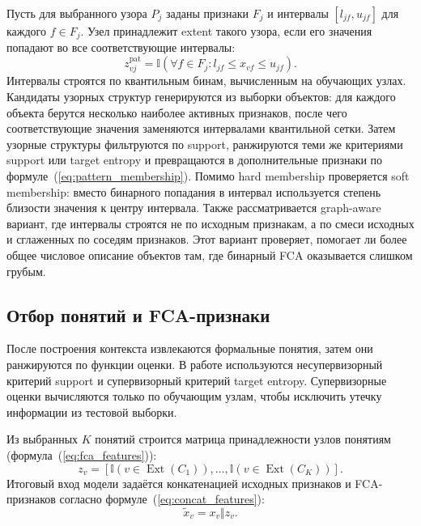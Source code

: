 \documentclass[14pt,a4paper]{extarticle}
\begin{document}
Пусть для выбранного узора $P_j$ заданы признаки $F_j$ и интервалы
$[l_{jf}, u_{jf}]$ для каждого $f \in F_j$. Узел принадлежит extent такого узора,
если его значения попадают во все соответствующие интервалы:
\begin{equation}
    z_{vj}^{\mathrm{pat}} =
    \mathbb{I}
    \left(
        \forall f \in F_j:
        l_{jf} \leq x_{vf} \leq u_{jf}
    \right).
    \label{eq:pattern_membership}
\end{equation}
Интервалы строятся по квантильным бинам, вычисленным на обучающих узлах. Кандидаты
узорных структур генерируются из выборки объектов: для каждого объекта берутся
несколько наиболее активных признаков, после чего соответствующие значения
заменяются интервалами квантильной сетки. Затем узорные структуры фильтруются по
support, ранжируются теми же критериями support или target entropy и превращаются
в дополнительные признаки по формуле~(\ref{eq:pattern_membership}). Помимо hard
membership проверяется soft membership: вместо бинарного попадания в интервал
используется степень близости значения к центру интервала. Также рассматривается
graph-aware вариант, где интервалы строятся не по исходным признакам, а по смеси
исходных и сглаженных по соседям признаков. Этот вариант проверяет, помогает ли
более общее числовое описание объектов там, где бинарный FCA оказывается слишком
грубым.

\subsection{Отбор понятий и FCA-признаки}

После построения контекста извлекаются формальные понятия, затем они ранжируются
по функции оценки. В работе используются несупервизорный критерий support и
супервизорный критерий target entropy. Супервизорные оценки вычисляются только
по обучающим узлам, чтобы исключить утечку информации из тестовой выборки.

Из выбранных $K$ понятий строится матрица принадлежности узлов понятиям
(формула~(\ref{eq:fca_features})):
\begin{equation}
    z_v =
    \left[
        \mathbb{I}(v \in \operatorname{Ext}(C_1)),
        \ldots,
        \mathbb{I}(v \in \operatorname{Ext}(C_K))
    \right].
    \label{eq:fca_features}
\end{equation}
Итоговый вход модели задаётся конкатенацией исходных признаков и FCA-признаков
согласно формуле~(\ref{eq:concat_features}):
\begin{equation}
    \tilde{x}_v = x_v \Vert z_v.
    \label{eq:concat_features}
\end{equation}
\end{document}
